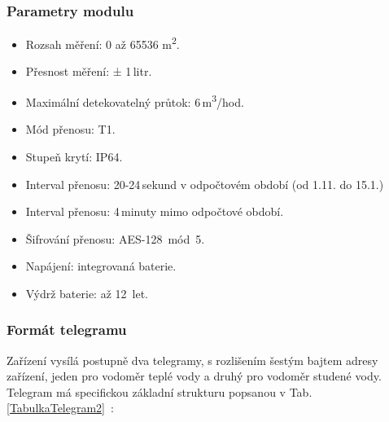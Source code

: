 \subsubsection{Parametry modulu}
\begin{itemize}
	\item Rozsah měření: 0 až 65536 m\textsuperscript{2}.
	\item Přesnost měření: ± 1\,litr.
	\item Maximální detekovatelný průtok: 6\,m\textsuperscript{3}/hod.
	\item Mód přenosu: T1.
	\item Stupeň krytí: IP64.
	\item Interval přenosu: 20-24\,sekund v odpočtovém období (od 1.11. do 15.1.)
	\item Interval přenosu: 4\,minuty mimo odpočtové období.
	\item Šifrování přenosu: AES-128~mód~5.
	\item Napájení: integrovaná baterie.
	\item Výdrž baterie: až 12~let.
\end{itemize}


\subsubsection{Formát telegramu}
Zařízení vysílá postupně dva telegramy, s rozlišením šestým bajtem adresy zařízení, jeden pro vodoměr teplé vody a druhý pro vodoměr studené vody.
Telegram má specifickou základní strukturu popsanou v Tab. \ref{TabulkaTelegram2}~\cite{CidloBonega}:

